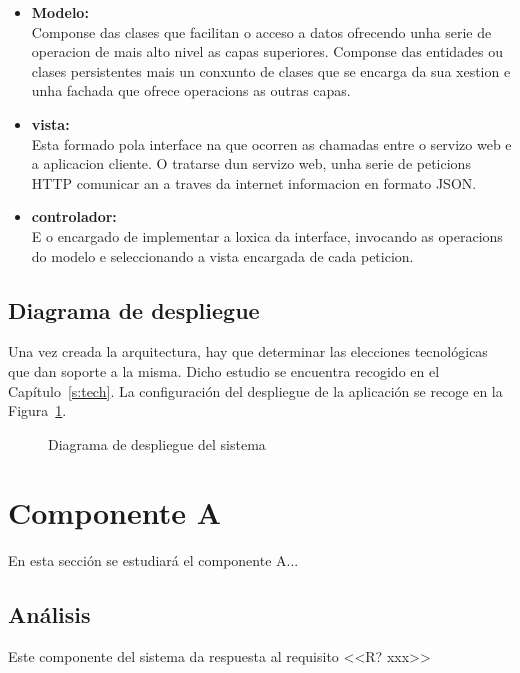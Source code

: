 \begin{itemize}
\item \textbf{Modelo:}\\
Componse das clases que facilitan o acceso a datos ofrecendo unha serie de operacion
de mais alto nivel as capas superiores. Componse das entidades ou clases persistentes
mais un conxunto de clases que se encarga da sua xestion e unha fachada que ofrece
operacions as outras capas.
\item \textbf{vista:}\\
Esta formado pola interface na que ocorren as chamadas entre o servizo web e a
aplicacion cliente. O tratarse dun servizo web, unha serie de peticions HTTP comunicar
an a traves da internet informacion en formato JSON.

\item \textbf{controlador:}\\

E
o encargado de implementar a loxica da interface, invocando as operacions do
modelo e seleccionando a vista encargada de cada peticion.



\end{itemize}




\subsection{Diagrama de despliegue}
Una vez creada la arquitectura, hay que determinar las elecciones tecnológicas que dan soporte a la misma. Dicho estudio se encuentra recogido en el Capítulo~\ref{s:tech}. La configuración del despliegue de la aplicación se recoge en la Figura~\ref{f:dev:arch-deploy}.

\begin{figure}[h!]
\centering
\caption{Diagrama de despliegue del sistema}
\label{f:dev:arch-deploy}
\end{figure}


\section{Componente A}
En esta sección se estudiará el componente A...

\subsection{Análisis}
Este componente del sistema da respuesta al requisito <<R? xxx>> 

